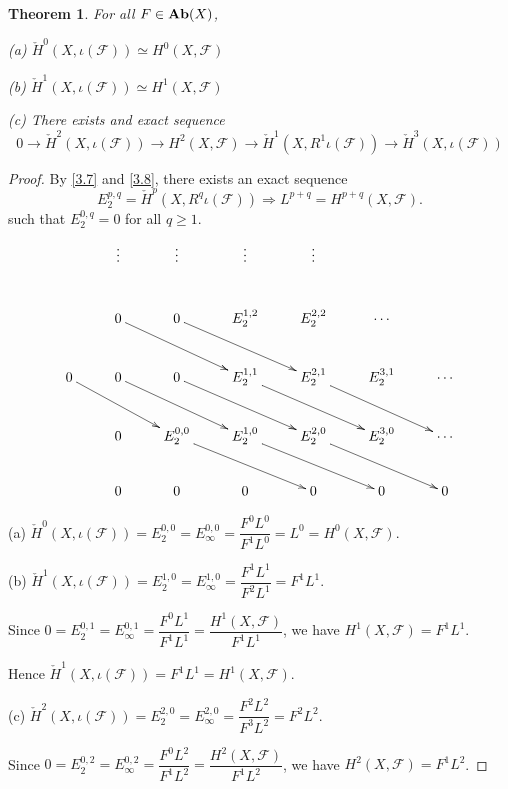 \documentclass{amsart}
\numberwithin{equation}{section}
\theoremstyle{plain}
\newtheorem{thm}[equation]{Theorem}
\theoremstyle{definition}
\DeclareMathOperator{\Ab}{\mathbf{Ab}}
\begin{document}
\begin{thm}\label{main}
	For all $ \mathscr \mathscr F\in \Ab(X) $, 
	
	(a) $\check{H}^0(X,\iota(\mathscr F))\simeq H^0(X, \mathscr F)$
	
	(b) $\check{H}^1(X,\iota(\mathscr F))\simeq H^1(X, \mathscr F)$
	
	(c) There exists and exact sequence $$0\to \check{H}^2(X,\iota(\mathscr F))\to H^2(X, \mathscr F)\to \check{H}^1(X, R^1\iota(\mathscr F))\to \check{H}^3(X, \iota(\mathscr F))$$
	
\end{thm}

\begin{proof}
	
	By \cref{3.7} and \cref{3.8}, there exists an exact sequence
	\[E_2^{p,q}=\check{H}^p(X, R^q\iota (\mathscr F))\Rightarrow L^{p+q}=H^{p+q}(X, \mathscr F).\]
	such that $ E_2^{0,q}=0 $ for all $ q\ge 1 $. 
	\begin{equation}
		\xymatrix{
			 &\vdots&\vdots &\vdots &\vdots &&\\
			&0\ar[rrd]&0 \ar[rrd]&E_2^{1,2}&E_2^{2,2} & \cdots&\\
			0\ar[rrd]&0\ar[rrd]&0 \ar[rrd]&E_2^{1,1} \ar[rrd]&E_2^{2,1}\ar[rrd] &E_2^{3,1}&\cdots\\
			&0&E_2^{0,0} \ar[rrd]&E_2^{1,0}\ar[rrd] &E_2^{2,0}\ar[rrd]  &E_2^{3,0}&\cdots\\
			&0&0&0 &0& 0&0\\
		}
	\end{equation}
	
	(a) $ \check{H}^0(X,\iota(\mathscr F))=E_2^{0,0}= E_{\infty}^{0,0}=\dfrac{F^0L^0}{F^1L^0}=L^0=H^0(X,\mathscr F) $. 
	
	(b) $ \check{H}^1(X,\iota(\mathscr F))=E_2^{1,0}= E_{\infty}^{1,0}=\dfrac{F^1L^1}{F^2L^1}=F^1L^1 $. 
	
	Since $0=E_2^{0,1}= E_{\infty}^{0,1}=\dfrac{F^0L^1}{F^1L^1}=\dfrac{H^1(X,\mathscr F)}{F^1L^1} $, we have $ H^1(X,\mathscr F)=F^1L^1 $. 
	
	Hence $ \check{H}^1(X,\iota(\mathscr F))=F^1L^1=H^1(X,\mathscr F)$. 
	
	(c) $ \check{H}^2(X,\iota(\mathscr F))=E_2^{2,0}= E_{\infty}^{2,0}=\dfrac{F^2L^2}{F^3L^2}=F^2L^2 $.  
	
	Since $ 0=E_2^{0,2}= E_{\infty}^{0,2}=\dfrac{F^0L^2}{F^1L^2}=\dfrac{H^2(X,\mathscr F)}{F^1L^2}$, we have $ H^2(X,\mathscr F)=F^1L^2 $. 
	

\end{proof}
\end{document}
